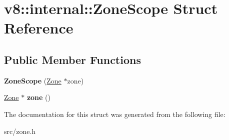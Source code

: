 \hypertarget{structv8_1_1internal_1_1_zone_scope}{}\section{v8\+:\+:internal\+:\+:Zone\+Scope Struct Reference}
\label{structv8_1_1internal_1_1_zone_scope}
\subsection*{Public Member Functions}
\begin{DoxyCompactItemize}
\item 
\hypertarget{structv8_1_1internal_1_1_zone_scope_ae9b8da0afb3ef968d6d20064c1563916}{}{\bfseries Zone\+Scope} (\hyperlink{classv8_1_1internal_1_1_zone}{Zone} $\ast$zone)\label{structv8_1_1internal_1_1_zone_scope_ae9b8da0afb3ef968d6d20064c1563916}

\item 
\hypertarget{structv8_1_1internal_1_1_zone_scope_aa22a029ddd858e193e8ce10433de0125}{}\hyperlink{classv8_1_1internal_1_1_zone}{Zone} $\ast$ {\bfseries zone} ()\label{structv8_1_1internal_1_1_zone_scope_aa22a029ddd858e193e8ce10433de0125}

\end{DoxyCompactItemize}


The documentation for this struct was generated from the following file\+:\begin{DoxyCompactItemize}
\item 
src/zone.\+h\end{DoxyCompactItemize}

